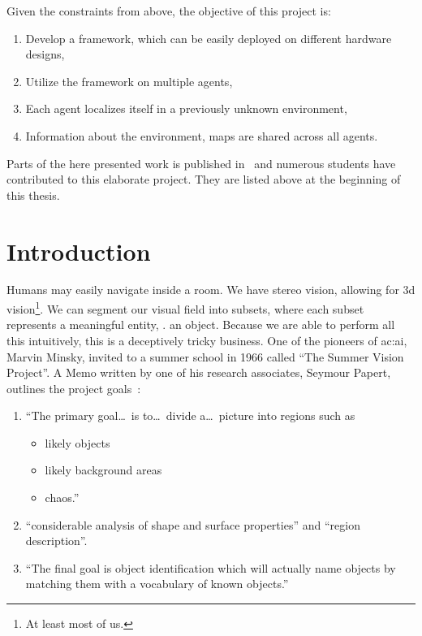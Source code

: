 Given the constraints from above, the objective of this project is:

\begin{enumerate}
  \item Develop a framework, which can be easily deployed on different hardware designs,
  \item Utilize the framework on multiple agents,
  \item Each agent localizes itself in a previously unknown environment,
  \item Information about the environment, \ie maps are shared across all agents.
\end{enumerate}

Parts of the here presented work is published in~\textcite{reichseerberscheid2018} and numerous students have contributed to this elaborate project.
They are listed above at the beginning of this thesis.





\section{Introduction}
\label{sec:robot_introduction}

Humans may easily navigate inside a room.
We have stereo vision, allowing for 3d vision\footnote{At least most of us.}.
We can segment our visual field into subsets, where each subset represents a meaningful entity, \eg. an object.
Because we are able to perform all this intuitively, this is a deceptively tricky business.
One of the pioneers of \gls{ac:ai}, Marvin Minsky, invited to a summer school in 1966 called ``The Summer Vision Project''.
A Memo written by one of his research associates, Seymour Papert, outlines the project goals~\cite[p. 2f]{papert1966summer}:

\begin{enumerate}
  \item ``The primary goal\ldots\ is to\ldots\ divide a\ldots\ picture into regions such as
    \begin{itemize}
      \item likely objects
      \item likely background areas
      \item chaos.''
    \end{itemize}
  \item ``considerable analysis of shape and surface properties'' and ``region description''.
  \item ``The final goal is object identification which will actually name objects by matching them with a vocabulary of known objects.''
\end{enumerate}

